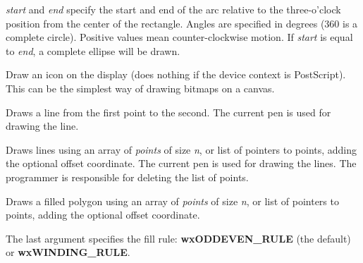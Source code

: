 {\it start} and {\it end} specify the start and end of the arc relative to the three-o'clock
position from the center of the rectangle. Angles are specified
in degrees (360 is a complete circle). Positive values mean
counter-clockwise motion. If {\it start} is equal to {\it end}, a
complete ellipse will be drawn.

\label{wxdcdrawicon}


Draw an icon on the display (does nothing if the device context is PostScript).
This can be the simplest way of drawing bitmaps on a canvas.

\label{wxdcdrawline}


Draws a line from the first point to the second. The current pen is used
for drawing the line.




Draws lines using an array of {\it points} of size {\it n}, or list of
pointers to points, adding the optional offset coordinate. The current
pen is used for drawing the lines.  The programmer is responsible for
deleting the list of points.




Draws a filled polygon using an array of {\it points} of size {\it n},
or list of pointers to points, adding the optional offset coordinate.

The last argument specifies the fill rule: {\bf wxODDEVEN\_RULE} (the
default) or {\bf wxWINDING\_RULE}.

